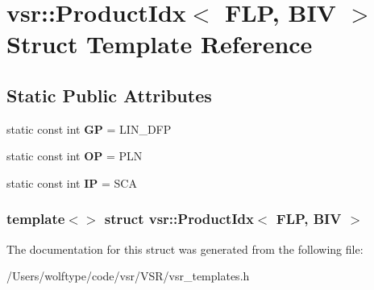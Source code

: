 \hypertarget{structvsr_1_1_product_idx_3_01_f_l_p_00_01_b_i_v_01_4}{\section{vsr\-:\-:Product\-Idx$<$ F\-L\-P, B\-I\-V $>$ Struct Template Reference}
\label{structvsr_1_1_product_idx_3_01_f_l_p_00_01_b_i_v_01_4}
}
\subsection*{Static Public Attributes}
\begin{DoxyCompactItemize}
\item 
\hypertarget{structvsr_1_1_product_idx_3_01_f_l_p_00_01_b_i_v_01_4_ae6328d2e02cc3a15dec70201df8bc4a0}{static const int {\bfseries G\-P} = L\-I\-N\-\_\-\-D\-F\-P}\label{structvsr_1_1_product_idx_3_01_f_l_p_00_01_b_i_v_01_4_ae6328d2e02cc3a15dec70201df8bc4a0}

\item 
\hypertarget{structvsr_1_1_product_idx_3_01_f_l_p_00_01_b_i_v_01_4_a7f040848e49e13499240f7528bc491f0}{static const int {\bfseries O\-P} = P\-L\-N}\label{structvsr_1_1_product_idx_3_01_f_l_p_00_01_b_i_v_01_4_a7f040848e49e13499240f7528bc491f0}

\item 
\hypertarget{structvsr_1_1_product_idx_3_01_f_l_p_00_01_b_i_v_01_4_a47c05baef932e5ba385fb4bfb4b4bc47}{static const int {\bfseries I\-P} = S\-C\-A}\label{structvsr_1_1_product_idx_3_01_f_l_p_00_01_b_i_v_01_4_a47c05baef932e5ba385fb4bfb4b4bc47}

\end{DoxyCompactItemize}
\subsubsection*{template$<$$>$ struct vsr\-::\-Product\-Idx$<$ F\-L\-P, B\-I\-V $>$}



The documentation for this struct was generated from the following file\-:\begin{DoxyCompactItemize}
\item 
/\-Users/wolftype/code/vsr/\-V\-S\-R/vsr\-\_\-templates.\-h\end{DoxyCompactItemize}
